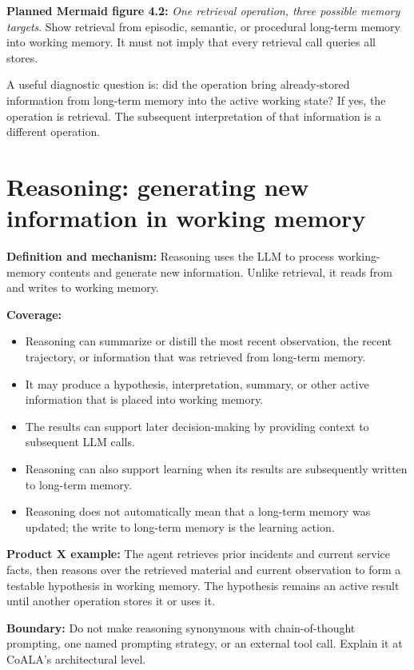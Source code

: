 \textbf{Planned Mermaid figure 4.2:} \emph{One retrieval operation, three possible memory targets}. Show retrieval from episodic, semantic, or procedural long-term memory into working memory. It must not imply that every retrieval call queries all stores.

\begin{tipbox}
A useful diagnostic question is: did the operation bring already-stored information from long-term memory into the active working state? If yes, the operation is retrieval. The subsequent interpretation of that information is a different operation.
\end{tipbox}

\section{Reasoning: generating new information in working memory}
\textbf{Definition and mechanism:} Reasoning uses the LLM to process working-memory contents and generate new information. Unlike retrieval, it reads from and writes to working memory.

\textbf{Coverage:}
\begin{itemize}
  \item Reasoning can summarize or distill the most recent observation, the recent trajectory, or information that was retrieved from long-term memory.
  \item It may produce a hypothesis, interpretation, summary, or other active information that is placed into working memory.
  \item The results can support later decision-making by providing context to subsequent LLM calls.
  \item Reasoning can also support learning when its results are subsequently written to long-term memory.
  \item Reasoning does not automatically mean that a long-term memory was updated; the write to long-term memory is the learning action.
\end{itemize}

\textbf{Product X example:} The agent retrieves prior incidents and current service facts, then reasons over the retrieved material and current observation to form a testable hypothesis in working memory. The hypothesis remains an active result until another operation stores it or uses it.

\textbf{Boundary:} Do not make reasoning synonymous with chain-of-thought prompting, one named prompting strategy, or an external tool call. Explain it at CoALA's architectural level.

